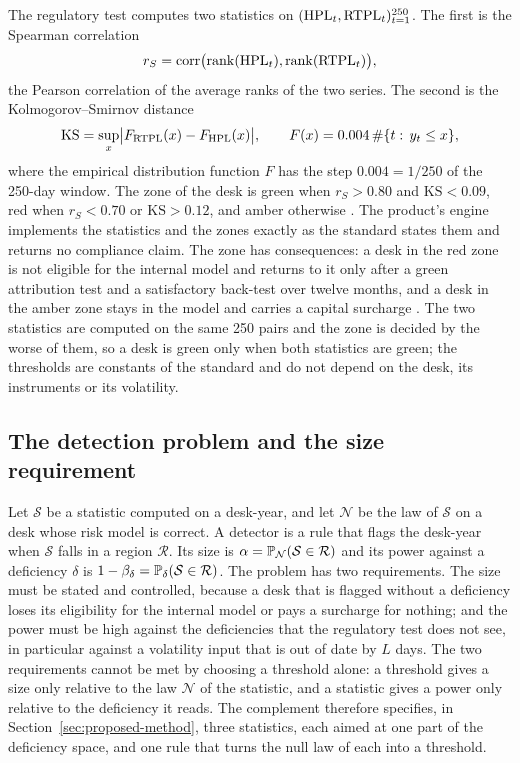 The regulatory test computes two statistics on $(\mathrm{HPL}_t,\mathrm{RTPL}_t)_{t=1}^{250}$.
The first is the Spearman correlation
\begin{equation}
r_S=\operatorname{corr}\bigl(\operatorname{rank}(\mathrm{HPL}_t),\operatorname{rank}(\mathrm{RTPL}_t)\bigr),
\label{eq:spearman}
\end{equation}
the Pearson correlation of the average ranks of the two series.
The second is the Kolmogorov--Smirnov distance
\begin{equation}
\mathrm{KS}=\sup_x\bigl|F_{\mathrm{RTPL}}(x)-F_{\mathrm{HPL}}(x)\bigr|,\qquad F(x)=0.004\,\#\{t:\,y_t\le x\},
\label{eq:ks}
\end{equation}
where the empirical distribution function $F$ has the step $0.004=1/250$ of the 250-day window.
The zone of the desk is green when $r_S>0.80$ and $\mathrm{KS}<0.09$, red when $r_S<0.70$ or $\mathrm{KS}>0.12$, and amber otherwise \citep{bcbs2019}.
The product's engine implements the statistics and the zones exactly as the standard states them and returns no compliance claim.
The zone has consequences: a desk in the red zone is not eligible for the internal model and returns to it only after a green attribution test and a satisfactory back-test over twelve months, and a desk in the amber zone stays in the model and carries a capital surcharge \citep{bcbs2019}.
The two statistics are computed on the same 250 pairs and the zone is decided by the worse of them, so a desk is green only when both statistics are green; the thresholds are constants of the standard and do not depend on the desk, its instruments or its volatility.

\subsection{The detection problem and the size requirement}
\label{sec:problem-detection}

Let $\mathcal S$ be a statistic computed on a desk-year, and let $\mathcal N$ be the law of $\mathcal S$ on a desk whose risk model is correct.
A detector is a rule that flags the desk-year when $\mathcal S$ falls in a region $\mathcal R$.
Its size is $\alpha=\mathbb{P}_{\mathcal N}(\mathcal S\in\mathcal R)$ and its power against a deficiency $\delta$ is $1-\beta_\delta=\mathbb{P}_\delta(\mathcal S\in\mathcal R)$.
The problem has two requirements.
The size must be stated and controlled, because a desk that is flagged without a deficiency loses its eligibility for the internal model or pays a surcharge for nothing; and the power must be high against the deficiencies that the regulatory test does not see, in particular against a volatility input that is out of date by $L$ days.
The two requirements cannot be met by choosing a threshold alone: a threshold gives a size only relative to the law $\mathcal N$ of the statistic, and a statistic gives a power only relative to the deficiency it reads.
The complement therefore specifies, in Section~\ref{sec:proposed-method}, three statistics, each aimed at one part of the deficiency space, and one rule that turns the null law of each into a threshold.

